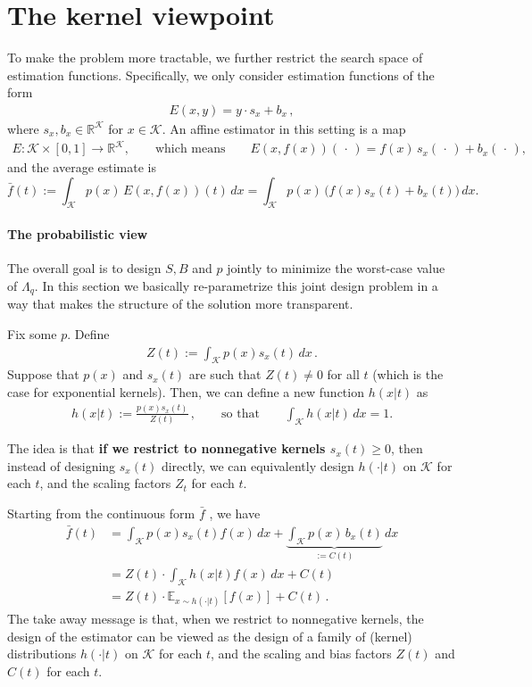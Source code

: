 \documentclass{article}
\theoremstyle{plain}
\theoremstyle{definition}
\theoremstyle{plain}
\newcommand{\R}{\mathbb R}
\newcommand{\E}{\mathbb E}
\newcommand{\K}{\mathcal K}
\newcommand{\cK}{\mathcal K}
\begin{document}
\section{The kernel viewpoint}
To make the problem more tractable, we further restrict the search space of estimation functions.
Specifically, we only consider estimation functions of the form
\begin{align}
    E(x, y) = y \cdot s_x + b_x\,,
\end{align}
where $s_x, b_x \in \R^\K$ for $x \in \K$.
An affine estimator in this setting is a map
\begin{align}
    E: \cK \times[0,1]\to \R^\K,\qquad \text{which means} \qquad
    E(x,f(x))(\,\cdot\,)= f(x)\,s_x(\,\cdot\,) + b_x(\,\cdot\,),
\end{align}
and the average estimate is
\begin{equation}
    \bar f(t) := \int_\K p(x)\,E(x,f(x))(t)\,dx
    = \int_\K p(x)\,\bigl(f(x)s_x(t)+b_x(t)\bigr)\,dx.
    \label{eq:barf_def}
\end{equation}

\paragraph{The probabilistic view}
The overall goal is to design $S, B$ and $p$ jointly to minimize the worst-case value of $\Lambda_q$.
In this section we basically re-parametrize this joint design problem in a way that makes the structure of the solution more transparent.

Fix some $p$.
Define
\begin{align}
    Z(t) := \int_\K p(x) s_x(t) \,dx\,.
\end{align}
Suppose that $p(x)$ and $s_x(t)$ are such that $Z(t) \neq 0$ for all $t$ (which is the case for exponential kernels).
Then, we can define a new function $h(x|t)$ as
\begin{align}
    h(x|t) := \frac{p(x) s_x(t)}{Z(t)}\,, \qquad \text{so that} \qquad \int_\K h(x|t) \, dx = 1.
\end{align}

The idea is that \textbf{if we restrict to nonnegative kernels $s_x(t) \ge 0$},
then instead of designing $s_x(t)$ directly, we can equivalently design $h(\cdot|t)$ on $\K$ for each $t$,
and the scaling factors $Z_t$ for each $t$.

Starting from the continuous form $\bar{f}$ , we have
\begin{align}
    \bar{f}(t) & = \int_{\K} p(x) s_x(t) f(x) \,dx + \underbrace{\int_{\K} p(x)\,b_x(t)}_{:=C(t)}\,dx \\
               & = Z(t) \cdot \int_{\K} h(x|t) f(x) \, dx + C(t)                                      \\
               & = Z(t) \cdot \E_{x\sim h(\cdot|t)}[f(x)] + C(t)\,.
\end{align}
The take away message is that, when we restrict to nonnegative kernels, the design of the estimator can be viewed as the design
of a family of (kernel) distributions $h(\cdot|t)$ on $\K$ for each $t$, and the scaling and bias factors $Z(t)$ and $C(t)$ for each $t$.
\end{document}
